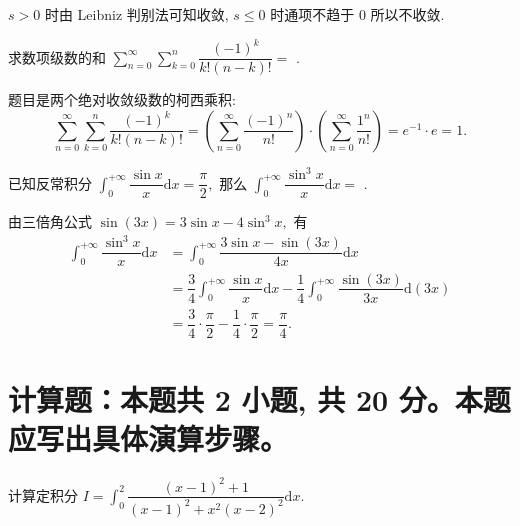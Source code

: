 \begin{solution}
$s > 0$ 时由 Leibniz 判别法可知收敛, $s \leqslant 0$ 时通项不趋于 $0$ 所以不收敛.
\end{solution}

\begin{question}
求数项级数的和 $\displaystyle \sum_{n=0}^{\infty} \sum_{k=0}^n \dfrac{(-1)^k}{k!(n-k)!} =$ \fillin[1].
\end{question}

\begin{solution}
题目是两个绝对收敛级数的柯西乘积:
$$\sum_{n=0}^{\infty} \sum_{k=0}^n \dfrac{(-1)^k}{k!(n-k)!} = \left( \sum_{n=0}^{\infty} \dfrac{(-1)^n}{n!} \right) \cdot \left( \sum_{n=0}^{\infty} \dfrac{1^n}{n!} \right) = e^{-1} \cdot e = 1.$$
\end{solution}

\begin{question}
已知反常积分 $\int_0^{+\infty} \dfrac{\sin x}{x} \mathrm{d} x = \dfrac{\pi}{2},$ 那么 $\int_0^{+\infty} \dfrac{\sin^3 x}{x} \mathrm{d} x =$ \fillin[$\dfrac{\pi}{4}$].
\end{question}

\begin{solution}
由三倍角公式 $\displaystyle \sin(3x) = 3\sin x - 4\sin^{3} x,$ 有
\begin{equation*}
\begin{aligned}
\int_0^{+\infty} \dfrac{\sin^3 x}{x} \mathrm{d} x & = \int_0^{+\infty} \dfrac{3\sin x - \sin(3x)}{4x} \mathrm{d} x \\
& = \dfrac{3}{4} \int_0^{+\infty} \dfrac{\sin x}{x} \mathrm{d} x - \dfrac{1}{4} \int_0^{+\infty} \dfrac{\sin (3x)}{3x} \mathrm{d} (3x) \\
& = \dfrac{3}{4} \cdot \dfrac{\pi}{2} - \dfrac{1}{4} \cdot \dfrac{\pi}{2} = \dfrac{\pi}{4}.
\end{aligned}
\end{equation*}
\end{solution}


\section{计算题：本题共 2 小题, 共 20 分。本题应写出具体演算步骤。}


\begin{question}[points = 10]
计算定积分 $\displaystyle I = \int_0^2 \dfrac{(x-1)^2 + 1}{(x-1)^2 + x^2(x-2)^2} \mathrm{d} x.$

\end{question}

